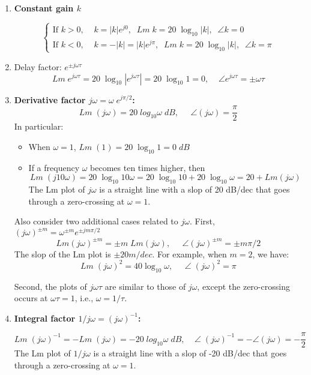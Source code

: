 \begin{enumerate}
\item {\bf Constant gain $k$}

  \[ \left\{ \begin{array}{l}
    \mbox{If $k>0, \;\;\;\;k=|k|e^{j0}, \;\;Lm\;k=20 \;\log_{10}|k|,\;\;\angle k=0$} \\
    \mbox{If $k<0, \;\;\;\;k=-|k|=|k|e^{j\pi}, \;\;Lm\;k=20\;\log_{10}|k|,\;\;\angle k=\pi$} 
    \end{array} \right. \]

\item Delay factor: $e^{\pm j\omega \tau}$
  \[ Lm \;e^{ j\omega \tau}=20\;\log_{10} |e^{ j\omega \tau}|=20\;\log_{10} 1=0,\;\;\;\;
  \angle e^{ j\omega \tau} =\pm \omega \tau \]

\item {\bf Derivative factor $j\omega=\omega\; e^{j\pi/2}$:}
  \[ Lm\; (j\omega)=20\; log_{10} \omega\;dB,\;\;\;\;\;\angle(j\omega)=\frac{\pi}{2} \]
  In particular:
  \begin{itemize}
  \item When $\omega=1$, $Lm \;(1) =20\; \log_{10} 1=0\;dB$
  \item If a frequency $\omega$ becomes ten times higher, then
    \[ Lm\; (j10\omega)=20\; \log_{10} 10\omega=20 \;\log_{10} 10+20\;\log_{10}\omega 
    =20+Lm(j\omega) \]
    The Lm plot of $j\omega$ is a straight line with a slop of 20 dB/dec that goes
    through a zero-crossing at $\omega=1$.

  \end{itemize}

  Also consider two additional cases related to $j\omega$. First, 
  $(j\omega)^{\pm m}=\omega^{\pm m} e^{\pm j m\pi/2}$
  \[ Lm(j\omega)^{\pm m}=\pm m\;Lm(j\omega),\;\;\;\;\;\angle(j\omega)^{\pm m}=\pm m\pi/2\]
  The slop of the Lm plot is $\pm 20m/dec$. For example, when $m=2$, we have:
  \[ Lm\; (j\omega)^2=40\log_{10}\omega,\;\;\;\;\;\angle\;(j\omega)^2=\pi \]

  Second, the plots of $j\omega\tau$ are similar to those of $j\omega$, except the
  zero-crossing occurs at $\omega\tau=1$, i.e., $\omega=1/\tau$.

\item {\bf Integral factor $1/j\omega=(j\omega)^{-1}$:}

  \[ Lm \;(j\omega)^{-1}=-Lm\;(j\omega)=-20\;log_{10} \omega\;dB,
  \;\;\;\;\angle\; (j\omega)^{-1}=-\angle(j\omega)=-\frac{\pi}{2} \]
  The Lm plot of $1/j\omega$ is a straight line with a slop of -20 dB/dec that goes
  through a zero-crossing at $\omega=1$.


\end{enumerate}
